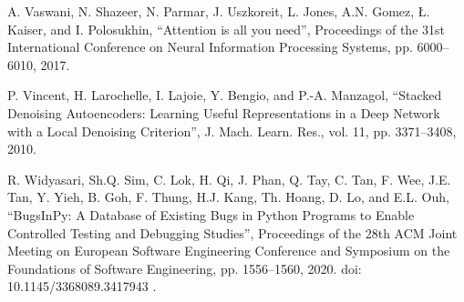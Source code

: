\documentclass[10pt,conference]{IEEEtran}
\begin{document}
\begin{thebibliography}{00}
 A. Vaswani, N. Shazeer, N. Parmar, J. Uszkoreit, L. Jones, A.N. Gomez, \L. Kaiser, and I. Polosukhin,
 ``Attention is all you need'',
 Proceedings of the 31st International Conference on Neural Information Processing Systems, pp. 6000--6010, 2017.

P. Vincent, H. Larochelle, I. Lajoie, Y. Bengio, and P.-A. Manzagol,
 ``Stacked Denoising Autoencoders: Learning Useful Representations in a Deep Network with a Local Denoising Criterion'',
J. Mach. Learn. Res., vol. 11, pp. 3371--3408, 2010.

R. Widyasari, Sh.Q. Sim, C. Lok, H. Qi, J. Phan, Q. Tay, C. Tan, F. Wee, J.E. Tan, Y. Yieh, B. Goh, F. Thung, H.J. Kang, Th. Hoang, D. Lo, and E.L. Ouh,
``BugsInPy: A Database of Existing Bugs in Python Programs to Enable Controlled Testing and Debugging Studies'',
 Proceedings of the 28th ACM Joint Meeting on European Software Engineering Conference and Symposium on the Foundations of Software Engineering,
 pp. 1556--1560, 2020. doi: 10.1145/3368089.3417943 .

\end{thebibliography}
\end{document}
